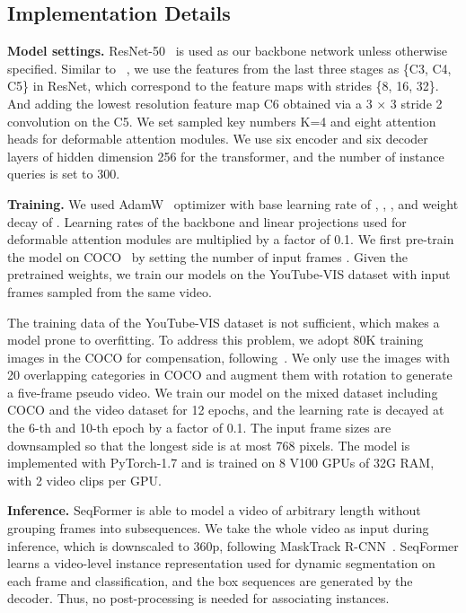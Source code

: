 \documentclass[runningheads]{llncs}
\begin{document}
\subsection{ Implementation Details}

\noindent\textbf{Model settings.}
ResNet-50~\cite{resnet} is used as our backbone network unless otherwise specified. Similar to ~\cite{deformableDETR}, we use the features from the last three stages as \{C3, C4, C5\} in ResNet, which correspond to the feature maps with strides \{8, 16, 32\}. And adding the lowest resolution feature map C6 obtained via a 3 × 3 stride 2 convolution on the C5.
We set sampled key numbers K=4 and eight attention heads for deformable attention modules.
We use six encoder and six decoder layers of hidden dimension 256 for the transformer, and the number of instance queries is set to 300. 



\noindent\textbf{Training.}
We used AdamW~\cite{AdamW} optimizer with base learning rate of ,  , , and weight decay of . Learning rates of the backbone and linear projections used for deformable attention modules are multiplied by a factor of 0.1.
We first pre-train the model on COCO~\cite{coco} by setting the number of input frames  .
Given the pretrained weights, we train our models on the YouTube-VIS dataset with input frames   sampled from the same video. 

The training data of the YouTube-VIS dataset is not sufficient, which makes a model prone to overfitting. To address this problem, we adopt 80K training images in the COCO for compensation, following~\cite{athar2020stem,ProposeReduce}. 
We only use the images with 20 overlapping categories in COCO and augment them with   rotation to generate a five-frame pseudo video.
We train our model on the mixed dataset including COCO and the video dataset for 12 epochs, and the learning rate is decayed at the 6-th and 10-th epoch by a factor of 0.1. The input frame sizes are downsampled so that the longest side is at most 768 pixels.
The model is implemented with PyTorch-1.7 and is trained on 8 V100 GPUs of 32G RAM, with 2 video clips per GPU. 

\noindent\textbf{Inference. }
SeqFormer is able to model a video of arbitrary length without grouping frames into subsequences. 
We take the whole video as input during inference, which is downscaled to 360p, following MaskTrack R-CNN~\cite{yang2019video}.
SeqFormer learns a video-level instance representation used for dynamic segmentation on each frame and classification, and the box sequences are generated by the decoder. Thus, no post-processing is needed for associating instances.
\end{document}
